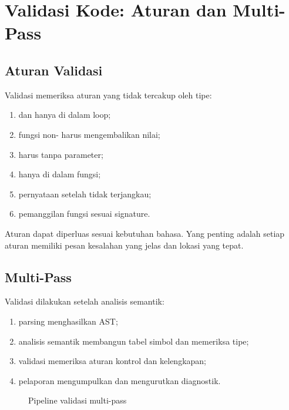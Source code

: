 \section{Validasi Kode: Aturan dan Multi-Pass}
\label{sec:ch16-validasi}

\subsection{Aturan Validasi}

Validasi memeriksa aturan yang tidak tercakup oleh tipe:
\begin{enumerate}[label=\arabic*.,leftmargin=*]
  \item {} dan  hanya di dalam loop;
  \item fungsi non- harus mengembalikan nilai;
  \item {} harus  tanpa parameter;
  \item {} hanya di dalam fungsi;
  \item pernyataan setelah  tidak terjangkau;
  \item pemanggilan fungsi sesuai signature.
\end{enumerate}

Aturan dapat diperluas sesuai kebutuhan bahasa. Yang penting adalah
setiap aturan memiliki pesan kesalahan yang jelas dan lokasi yang
tepat.

\subsection{Multi-Pass}

Validasi dilakukan setelah analisis semantik:
\begin{enumerate}[label=\arabic*.,leftmargin=*]
  \item parsing menghasilkan AST;
  \item analisis semantik membangun tabel simbol dan memeriksa tipe;
  \item validasi memeriksa aturan kontrol dan kelengkapan;
  \item pelaporan mengumpulkan dan mengurutkan diagnostik.
\end{enumerate}

\begin{figure}[H]
\centering
{}
\caption{Pipeline validasi multi-pass}
\label{fig:ch16-pipeline}
\end{figure}

